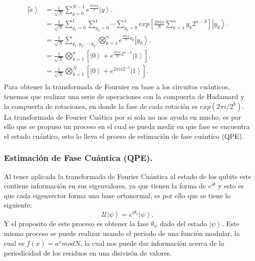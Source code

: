 \begin{align*}
    \left|\tilde{x} \right\rangle &= \frac{1}{\sqrt{N}} \sum\limits_{y=0}^{N-1} e^{\frac{2\pi i xy}{N} }\left|y \right\rangle.\\
    &=\frac{1}{\sqrt{N}}  \sum\limits_{y_1=0}^1\sum\limits_{y_2=0}^1 \cdots \sum\limits_{y_k=0}^1 exp\left[\frac{2\pi i x}{N} \sum\limits_{k=1}^n y_k 2^{n-k}\right] \left| y_k \right\rangle.\\
    &= \frac{1}{\sqrt{N}} \sum\limits_{y_1,y_2,\cdots, y_k} \bigotimes\limits_{k=1}^n e^{\frac{2\pi i x}{N}y_k} \left| y_k \right\rangle.\\
    &=\frac{1}{\sqrt{N}} \bigotimes\limits_{k=1}^n \left[\left|0 \right\rangle+e^{\frac{2\pi i x}{N} 2^{n-k}} \left| 1\right\rangle  \right].\\
    &=\frac{1}{\sqrt{N}} \bigotimes\limits_{k=1}^N \left[\left|0 \right\rangle+e^{2\pi i x 2^{-k}} \left| 1\right\rangle  \right].\\
\end{align*}
Para obtener la transformada de Fouruier en base a los circuitos cuánticos, tenemos que realizar una serie de operaciones con la compuerta de Hadamard y la compuerta de rotaciones, en donde la 
fase de cada rotación es $exp(2\pi i / 2^k)$. La transformada de Fourier Cuática por si sola no nos ayuda en mucho, es por ello que se propuso un proceso en el cual
se pueda medir en que fase se encuentra el estado cuántico, esto lo lleva el proeso de estimación de fase cuántico (QPE).
\subsubsection{Estimación de Fase Cuántica (QPE).}

Al tener aplicada la transformada de Fourier Cuántica al estado de los qubits este contiene información en sus eigenvalores, ya que tienen la forma de
$e^{i\theta}$ y esto es que cada eigenvector forma una base ortonormal, es por ello que se tiene lo siguiente:
\begin{equation*}
    \mathcal{U} \left|\psi \right\rangle = e^{i\theta_\psi}\left|\psi \right\rangle.
\end{equation*}
Y el proposito de este proceso es obtener la fase $\theta_\psi$ dado del estado $\left|\psi \right\rangle$. Este mismo proceso se puede realizar usando 
el periodo de una función modular, la cual es $f(x)=a^xmodN$, la cual nos puede dar información acerca de la periodicidad de los residuos en una disivisón de valores.
